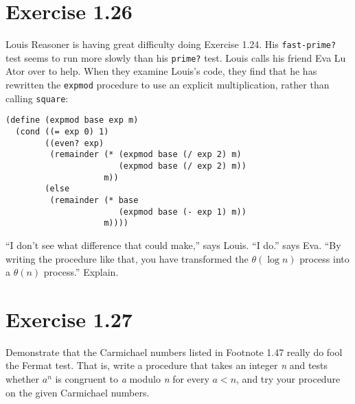 \documentclass[11pt]{article}
\begin{document}
\section{Exercise 1.26}
\label{sec:orge245984}
Louis Reasoner is having great difficulty doing Exercise 1.24. His
\texttt{fast-prime?} test seems to run more slowly than his \texttt{prime?} test. Louis
calls his friend Eva Lu Ator over to help. When they examine Louis’s code,
they find that he has rewritten the \texttt{expmod} procedure to use an explicit
multiplication, rather than calling \texttt{square}:
\begin{verbatim}
(define (expmod base exp m)
  (cond ((= exp 0) 1)
        ((even? exp)
         (remainder (* (expmod base (/ exp 2) m)
                       (expmod base (/ exp 2) m))
                    m))
        (else
         (remainder (* base
                       (expmod base (- exp 1) m))
                    m))))
\end{verbatim}
``I don't see what difference that could make,'' says Louis. ``I do.'' says
Eva. ``By writing the procedure like that, you have transformed the \(\theta(\log n)\) process into a \(\theta(n)\) process.'' Explain.
\section{Exercise 1.27}
\label{sec:org919afc1}
Demonstrate that the Carmichael numbers listed in Footnote 1.47 really do fool
the Fermat test. That is, write a procedure that takes an integer \emph{n} and
tests whether \(a^n\) is congruent to \emph{a} modulo \emph{n} for every \(a < n\),
and try your procedure on the given Carmichael numbers.
\end{document}
